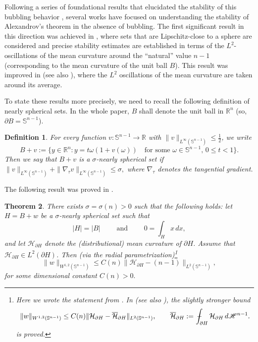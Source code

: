 \documentclass[reqno,11pt]{amsart}
\makeatletter
\def\sz{\sigma}
\newtheorem{thm}{Theorem}[section]
\newtheorem{defn}[thm]{Definition}%
\numberwithin{equation}{section}
\theoremstyle{remark}
\newcommand{\mean}[1]{\,-\hskip-1.08em\int_{#1}} %
\makeatother
\begin{document}
Following a series of foundational results that elucidated the stability of this bubbling behavior \cite{CM2017-2, KM2017, DMMN2018}, several works have focused on understanding the stability of Alexandrov's theorem in the absence of bubbling. The first significant result in this direction was achieved in \cite[Theorems 1.8 and 1.10]{KM2017}, where sets that are Lipschitz-close to a sphere are considered and precise stability estimates are established in terms of the  $L^2$-oscillations of the mean curvature around the ``natural'' value $n-1$ (corresponding to the mean curvature of the unit ball $B$). This result was improved in \cite{MPS2022} (see also \cite{FZ2023}), where the $L^2$ oscillations of the mean curvature are taken around its average.

To state these results more precisely, we need to recall the following definition of nearly spherical sets. In the whole paper, $B$ shall denote the unit ball in $\mathbb R^{n}$ (so, $\partial B=\mathbb S^{n-1}$).

\begin{defn}
\label{def:nearly spherical}
For every function $v\colon \mathbb S^{n-1}\to \mathbb R$ with $\|v\|_{L^\infty(\mathbb S^{n-1})}\le \frac 1 2 $, we write
$$
B+v:=\big\{y\in \mathbb R^n\colon y=t\omega(1+v(\omega))\quad \text{for some }\omega\in \mathbb S^{n-1}, \, 0\le t<1\big\}.
$$
Then we say that $B+v$ is a $\sigma$-nearly spherical set if $\|v\|_{L^{\infty}(\mathbb S^{n-1})}+\|\nabla_\tau v\|_{L^{\infty}(\mathbb S^{n-1})}\leq \sigma,$
where $\nabla_\tau$ denotes the tangential gradient.
\end{defn}


The following result was proved in \cite[Theorem 1.10]{KM2017}. 
\begin{thm}\label{thm:Fuglede}
There exists $\sz=\sz(n)>0$ such that the following holds:
let $H=B+w$ be a $\sigma$-nearly spherical set such that
$$|H|=|B|\qquad \text{ and }\qquad 0=\int_{H} x\, dx,$$
and let $\mathcal H_{\partial H}$ denote  the (distributional) mean curvature of $\partial H$.
Assume that $\mathcal H_{\partial H} \in L^2(\partial H)$. Then (via the radial parametrization)\footnote{Here we wrote the statement from \cite[Theorem 1.10]{KM2017}.  In \cite[Theorem 1.3]{MPS2022} (see also \cite[Theorem 1.6]{FZ2023}), the slightly stronger bound
$$
\|w\|_{W^{1,2}(\mathbb S^{n-1})}\le C(n) \|\mathcal H_{\partial H}-\overline{\mathcal H}_{\partial H}\|_{L^{2}(\mathbb S^{n-1})},\qquad \overline{\mathcal H}_{\partial H}:=\mean{\partial H}\mathcal H_{\partial H}\, d\mathscr H^{n-1}.
$$
is proved.}
$$
\|w\|_{W^{1,2}(\mathbb S^{n-1})}\le C(n) \|\mathcal H_{\partial H}-(n-1)\|_{L^{2}(\mathbb S^{n-1})},
$$
for some dimensional constant $C(n)>0.$
\end{thm}
\end{document}
